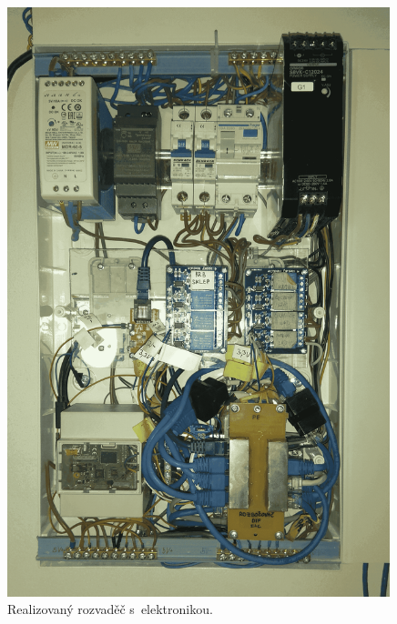 \newpage

\begin{figure}[H]
    \centering
    \includegraphics[width=0.99\textwidth]{images/rozvadec-ve-sklepe-s-elektronikou.png}
    \caption{Realizovaný rozvaděč s~elektronikou.}
    \label{fig:rozvadec-ve-sklepe-s-elektronikou}
\end{figure}







